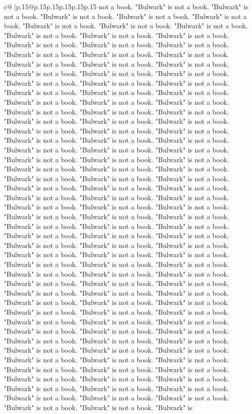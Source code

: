 \documentclass{article}
\begin{document}
{\begin{supertabular}{c@{$\;$}|p{.15\linewidth}@{}p{.15\linewidth}p{.15\linewidth}p{.15\linewidth}p{.15\linewidth}p{.15\linewidth}}
{{{not a book. "Bulwark" is not a book. "Bulwark" is not a book. "Bulwark" is not a book. "Bulwark" is not a book. "Bulwark" is not a book. "Bulwark" is not a book. "Bulwark" is not a book. "Bulwark" is not a book. "Bulwark" is not a book. "Bulwark" is not a book. "Bulwark" is not a book. "Bulwark" is not a book. "Bulwark" is not a book. "Bulwark" is not a book. "Bulwark" is not a book. "Bulwark" is not a book. "Bulwark" is not a book. "Bulwark" is not a book. "Bulwark" is not a book. "Bulwark" is not a book. "Bulwark" is not a book. "Bulwark" is not a book. "Bulwark" is not a book. "Bulwark" is not a book. "Bulwark" is not a book. "Bulwark" is not a book. "Bulwark" is not a book. "Bulwark" is not a book. "Bulwark" is not a book. "Bulwark" is not a book. "Bulwark" is not a book. "Bulwark" is not a book. "Bulwark" is not a book. "Bulwark" is not a book. "Bulwark" is not a book. "Bulwark" is not a book. "Bulwark" is not a book. "Bulwark" is not a book. "Bulwark" is not a book. "Bulwark" is not a book. "Bulwark" is not a book. "Bulwark" is not a book. "Bulwark" is not a book. "Bulwark" is not a book. "Bulwark" is not a book. "Bulwark" is not a book. "Bulwark" is not a book. "Bulwark" is not a book. "Bulwark" is not a book. "Bulwark" is not a book. "Bulwark" is not a book. "Bulwark" is not a book. "Bulwark" is not a book. "Bulwark" is not a book. "Bulwark" is not a book. "Bulwark" is not a book. "Bulwark" is not a book. "Bulwark" is not a book. "Bulwark" is not a book. "Bulwark" is not a book. "Bulwark" is not a book. "Bulwark" is not a book. "Bulwark" is not a book. "Bulwark" is not a book. "Bulwark" is not a book. "Bulwark" is not a book. "Bulwark" is not a book. "Bulwark" is not a book. "Bulwark" is not a book. "Bulwark" is not a book. "Bulwark" is not a book. "Bulwark" is not a book. "Bulwark" is not a book. "Bulwark" is not a book. "Bulwark" is not a book. "Bulwark" is not a book. "Bulwark" is not a book. "Bulwark" is not a book. "Bulwark" is not a book. "Bulwark" is not a book. "Bulwark" is not a book. "Bulwark" is not a book. "Bulwark" is not a book. "Bulwark" is not a book. "Bulwark" is not a book. "Bulwark" is not a book. "Bulwark" is not a book. "Bulwark" is not a book. "Bulwark" is not a book. "Bulwark" is not a book. "Bulwark" is not a book. "Bulwark" is not a book. "Bulwark" is not a book. "Bulwark" is not a book. "Bulwark" is not a book. "Bulwark" is not a book. "Bulwark" is not a book. "Bulwark" is not a book. "Bulwark" is not a book. "Bulwark" is not a book. "Bulwark" is not a book. "Bulwark" is not a book. "Bulwark" is not a book. "Bulwark" is not a book. "Bulwark" is not a book. "Bulwark" is not a book. "Bulwark" is not a book. "Bulwark" is not a book. "Bulwark" is not a book. "Bulwark" is not a book. "Bulwark" is not a book. "Bulwark" is not a book. "Bulwark" is not a book. "Bulwark" is not a book. "Bulwark" is not a book. "Bulwark" is not a book. "Bulwark" is not a book. "Bulwark" is not a book. "Bulwark" is not a book. "Bulwark" is not a book. "Bulwark" is not a book. "Bulwark" is not a book. "Bulwark" is not a book. "Bulwark" is not a book. "Bulwark" is not a book. "Bulwark" is not a book. "Bulwark" is not a book. "Bulwark" is }}}
\end{supertabular}}
\end{document}

